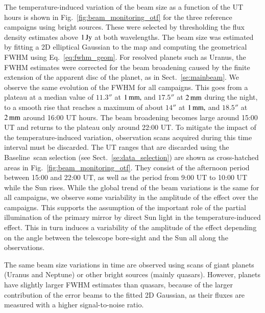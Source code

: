 \documentclass[traditionalabstract]{aa}
\newcommand{\baseline}{Baseline}%
\newcommand{\lp}[1]{#1}
\begin{document}
{The temperature-induced variation of the beam size as a function of
the UT hours is shown in Fig.~\ref{fig:beam_monitoring_otf} for the
three reference campaigns using bright sources. These were
selected by thresholding the flux density estimates above $1\,\rm{Jy}$
at both wavelengths. The beam size was estimated by fitting a 2D
elliptical Gaussian to the map {\lp and computing the geometrical FWHM
using Eq.~\ref{eq:fwhm_geom}.} For resolved planets such as Uranus, the
FWHM estimates were corrected for the beam broadening caused by the finite
extension of the apparent disc of the planet, as in
Sect.~\ref{se:mainbeam}.
We observe the same evolution of
the FWHM for all campaigns. 
This goes from a plateau at a median value of $11.3''$ at $1\,\rm{mm,}$
and $17.5''$ at $2\,\rm{mm}$ during the night, to a smooth rise that
reaches a maximum of about $14''$ at $1\,\rm{mm,}$ and $18.5''$ at
$2\,\rm{mm}$ around 16:00 UT hours. The beam broadening becomes large
around 15:00 UT and returns to the plateau only around 22:00 UT.
To mitigate the impact of the temperature-induced variation,
observation scans acquired during this time interval must be
discarded. The UT ranges that are discarded
using the \baseline\ scan selection (see
Sect.~\ref{se:data_selection}) are shown as cross-hatched areas in
Fig.~\ref{fig:beam_monitoring_otf}.
They consist of the afternoon
period between 15:00 and 22:00 UT, as well as the period from 9:00 UT to 10:00 UT while the Sun
rises. 
{\lp While the global trend of the beam variations is the
same for all campaigns, we observe some variability in the amplitude
of the effect over the campaigns. This supports the assumption of the
important role of the partial illumination of the primary mirror by
direct Sun light in the temperature-induced effect. This in turn
induces a variability of the amplitude of the effect depending on the
angle between the telescope bore-sight %
and the Sun all along the
observations.}

The same beam size variations in time are observed using scans of giant planets
(Uranus and Neptune) or other bright
sources (mainly quasars). However, planets have slightly larger FWHM
estimates than quasars, because of
the larger contribution of the error beams to the fitted 2D Gaussian,
as their fluxes are measured with a higher signal-to-noise ratio.


%

}
\end{document}
